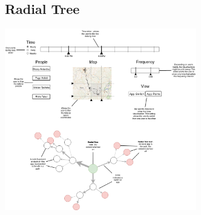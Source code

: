 \documentclass[a4paper, 11pt]{article}
\begin{document}
		\subsection{Radial Tree}
		\begin{center} \includegraphics[height=300px]{sketches/AppRadTree} \end{center}
\end{document}
